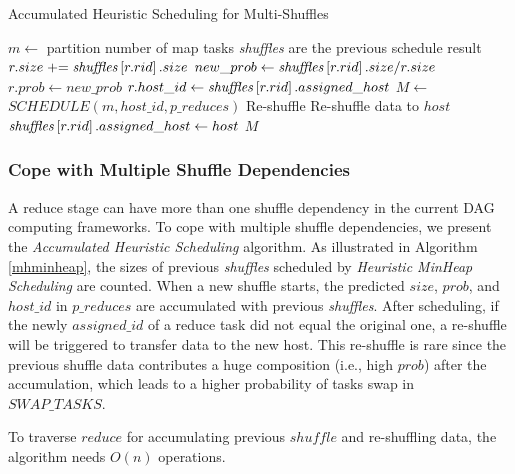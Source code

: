 \begin{minipage}{0.95\columnwidth}
	\begin{algorithm}[H]
	\caption{Accumulated Heuristic Scheduling for Multi-Shuffles}
	\label{mhminheap}
		\begin{algorithmic}[1]
		\small
			\State $m\gets$ partition number of map tasks
			\Comment \textit{shuffles} are the previous schedule result 
				\State $r.size \mathrel{+}= \text{\textit{shuffles}}\left[r.rid\right].size$
				\State $new\_prob\gets \text{\textit{shuffles}}\left[r.rid\right].size / r.size$
					\State $r.prob\gets new\_prob$
					\State $r.host\_id\gets \text{\textit{shuffles}}\left[r.rid\right].assigned\_host$
				\EndIf
			\EndFor
			\State $M\gets$ $SCHEDULE\left(m, host\_id, p\_reduces\right)$
				\Comment Re-shuffle
					\State Re-shuffle data to $host$
					\State $\text{\textit{shuffles}}\left[r.rid\right].assigned\_host\gets host$
					\EndIf
				\EndFor
			\EndFor
			\Return $M$
		\EndProcedure
		\end{algorithmic}
	\end{algorithm}
\end{minipage}

\subsubsection{Cope with Multiple Shuffle Dependencies}
{\color{black}
A reduce stage can have more than one shuffle dependency in the current DAG computing frameworks.
To cope with multiple shuffle dependencies, we present the \textit{Accumulated Heuristic Scheduling} algorithm.
}
As illustrated in Algorithm \ref{mhminheap}, the sizes of previous \textit{shuffles} scheduled by \textit{Heuristic MinHeap Scheduling} are counted. 
When a new shuffle starts, the predicted $size$, $prob$, and $host\_id$ in $p\_reduces$ are accumulated with previous \textit{shuffles}. 
After scheduling, if the newly $assigned\_id$ of a reduce task did not equal the original one, a re-shuffle will be triggered to transfer data to the new host. 
This re-shuffle is rare since the previous shuffle data contributes a huge composition (i.e., high $prob$) after the accumulation, 
which leads to a higher probability of tasks swap in $SWAP\_TASKS$. 

To traverse $reduce$ for accumulating previous $shuffle$ and re-shuffling data, the algorithm needs $O(n)$ operations.

